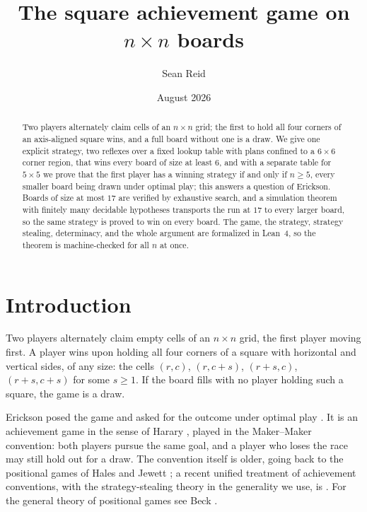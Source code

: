 \documentclass[11pt]{amsart}
\title{The square achievement game on $n \times n$ boards}
\author{Sean Reid}
\date{August 2026}
\theoremstyle{definition}
\theoremstyle{remark}
\begin{document}
\begin{abstract}
Two players alternately claim cells of an $n \times n$ grid; the
first to hold all four corners of an axis-aligned square wins, and a
full board without one is a draw. We give one explicit strategy, two
reflexes over a fixed lookup table with plans confined to a
$6 \times 6$ corner region, that wins every board of size at least
$6$, and with a separate table for $5 \times 5$ we prove that the
first player has a winning strategy if and only if $n \ge 5$, every
smaller board being drawn under optimal play; this answers a question
of Erickson. Boards of size at most $17$ are verified by exhaustive
search, and a simulation theorem with finitely many decidable
hypotheses transports the run at $17$ to every larger board, so the
same strategy is proved to win on every board. The game, the strategy, strategy stealing,
determinacy, and the whole argument are formalized in Lean~4, so the
theorem is machine-checked for all $n$ at once.
\end{abstract}

\maketitle

\section{Introduction}\label{sec:intro}

Two players alternately claim empty cells of an $n \times n$ grid, the
first player moving first. A player wins upon holding all four corners
of a square with horizontal and vertical sides, of any size: the cells
$(r,c)$, $(r,c+s)$, $(r+s,c)$, $(r+s,c+s)$ for some $s \ge 1$. If the
board fills with no player holding such a square, the game is a draw.

Erickson posed the game and asked for the outcome under optimal play
\cite{erickson-pearls, opg}. It is an achievement game in the sense
of Harary \cite{harary}, played in the Maker--Maker convention: both
players pursue the same goal, and a player who loses the race may
still hold out for a draw. The convention itself is older, going back
to the positional games of Hales and Jewett \cite{hales-jewett}; a
recent unified treatment of achievement conventions, with the
strategy-stealing theory in the generality we use, is
\cite{galliot-senizergues}. For the general theory of positional
games see Beck \cite{beck}.
\end{document}
